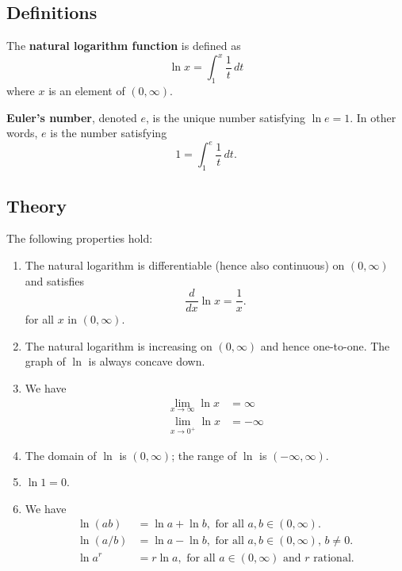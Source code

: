 \thispagestyle{fancy}
\subsection*{Definitions}
\begin{namedtheorem} The {\bf natural logarithm function}  is defined as
  \[
  \ln x=\int_1^x\frac{1}{t}\, dt
  \]
  where $x$ is an element of $(0,\infty)$.

\end{namedtheorem}
\begin{namedtheorem} {\bf Euler's number}, denoted $e$, is the unique number satisfying $\ln e=1$. In other words, $e$ is the number satisfying
  \[
  1=\int_1^e\frac{1}{t}\, dt.
  \]

\end{namedtheorem}
\subsection*{Theory}
\begin{namedtheorem}
  The following properties hold:
  \begin{enumerate}
    \item The natural logarithm is differentiable (hence also continuous) on $(0,\infty)$ and satisfies
    \[
    \frac{d}{dx}\ln x=\frac{1}{x}.
    \]
    for all $x$ in $(0,\infty)$.
    \item The natural logarithm is increasing on $(0,\infty)$ and hence one-to-one. The graph of $\ln$ is always concave down.
    \item We have
    \begin{align*}
      \lim_{x\to\infty}\ln x&=\infty\\
      \lim_{x\to 0^+}\ln x&=-\infty
    \end{align*}
    \item The domain of $\ln$ is $(0,\infty)$; the range of $\ln$ is $(-\infty, \infty)$.
    \item $\ln 1=0$.
    \item We have
    \begin{align*}
      \ln(ab)&=\ln a+\ln b,  \text{ for all $a,b\in (0,\infty)$.}\\
      \ln(a/b)&=\ln a-\ln b,  \text{ for all $a,b\in (0,\infty)$, $b\ne 0$.}\\
      \ln a^r&=r\ln a,  \text{ for all $a\in (0,\infty)$ and $r$ rational.}
    \end{align*}
  \end{enumerate}
\end{namedtheorem}

